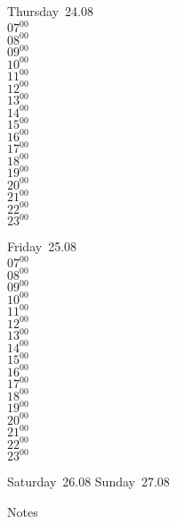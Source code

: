 \documentclass[11pt, a4paper]{book}\usepackage[]{graphicx}\usepackage[]{color}
\begin{document}
\begin{weekdaybox}
  Thursday~24.08\\
  { 
  \vfill
  $07^{00}$\\
$08^{00}$\\
$09^{00}$\\
$10^{00}$\\
$11^{00}$\\
$12^{00}$\\
$13^{00}$\\
$14^{00}$\\
$15^{00}$\\
$16^{00}$\\
$17^{00}$\\
$18^{00}$\\
$19^{00}$\\
$20^{00}$\\
$21^{00}$\\
$22^{00}$\\
$23^{00}$\\
  }
\end{weekdaybox} 
\begin{weekdaybox}
  Friday~25.08\\
  { 
  \vfill
  $07^{00}$\\
$08^{00}$\\
$09^{00}$\\
$10^{00}$\\
$11^{00}$\\
$12^{00}$\\
$13^{00}$\\
$14^{00}$\\
$15^{00}$\\
$16^{00}$\\
$17^{00}$\\
$18^{00}$\\
$19^{00}$\\
$20^{00}$\\
$21^{00}$\\
$22^{00}$\\
$23^{00}$\\
  }
\end{weekdaybox}
\begin{weekendbox}
  Saturday~26.08
  \tcblower
  Sunday~27.08
\end{weekendbox} %
\begin{notebox}
  Notes
\end{notebox}
\clearpage
\end{document}
